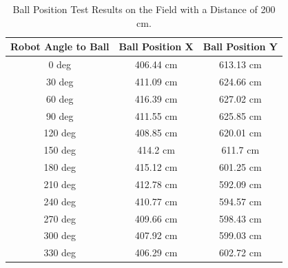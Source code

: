 \begin{table}[htbp]
  \caption{Ball Position Test Results on the Field with a Distance of 200 cm.}
  \begin{center}

  \begin{tabular}{|c|c|c|}
  \hline
  \rowcolor[HTML]{C0C0C0}
  \textbf{Robot Angle to Ball} & \textbf{Ball Position X} & \textbf{Ball Position Y} \\
  \hline
  0 deg            & 406.44 cm                & 613.13 cm            \\
  30 deg           & 411.09 cm                & 624.66 cm            \\
  60 deg           & 416.39 cm                & 627.02 cm            \\
  90 deg           & 411.55 cm                & 625.85 cm           \\
  120 deg           & 408.85 cm                & 620.01 cm           \\
  150 deg           & 414.2 cm                & 611.7 cm           \\
  180 deg           & 415.12 cm                & 601.25 cm           \\
  210 deg           & 412.78 cm                & 592.09 cm           \\
  240 deg           & 410.77 cm                & 594.57 cm           \\
  270 deg           & 409.66 cm                & 598.43 cm           \\
  300 deg           & 407.92 cm                & 599.03 cm           \\
  330 deg           & 406.29 cm                & 602.72 cm           \\
  \hline
\end{tabular}
\end{center}
\end{table}

